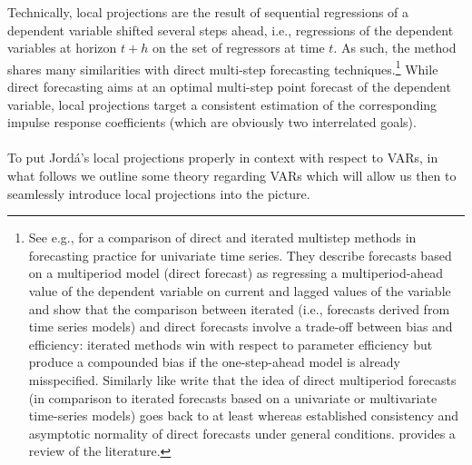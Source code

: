 \documentclass[a4paper,11pt,listof=nochaptergap,oneside,pointednumbers,bibtotoc,bigheadings,liststotoc]{scrbook}
\theoremstyle{mysatz}
\theoremstyle{mydefinition}
\theoremstyle{mybemerkung}
\begin{document}
Technically, local projections are the result of sequential regressions of a dependent variable shifted several steps ahead, i.e., regressions of the dependent variables at horizon $t+h$ on the set of regressors at time $t$. As such, the method shares many similarities with direct multi-step forecasting techniques.\footnote{See e.g., \citet{marcellinoetal:06} for a comparison of direct and iterated multistep methods in forecasting practice for univariate time series. They describe forecasts based on a multiperiod model (direct forecast) as regressing a multiperiod-ahead value of the dependent variable on current and lagged values of the variable and show that the comparison between iterated (i.e., forecasts derived from time series models) and direct forecasts involve a trade-off between bias and efficiency: iterated methods win with respect to parameter efficiency but produce a compounded bias if the one-step-ahead model is already misspecified. Similarly like \citet{jorda:05} write that the idea of direct multiperiod forecasts (in comparison to iterated forecasts based on a univariate or multivariate time-series models) goes back to at least \citet{cox:61} whereas \citet{weiss:91} established consistency and asymptotic normality of direct forecasts under general conditions. \citet{bhansali:02} provides a review of the literature.} While direct forecasting aims at an optimal multi-step point forecast of the dependent variable, local projections target a consistent estimation of the corresponding impulse response coefficients (which are obviously two interrelated goals).\\
\\
To put Jordá's local projections properly in context with respect to VARs, in what follows we outline some theory regarding VARs which will allow us then to seamlessly introduce local projections into the picture.
\end{document}
